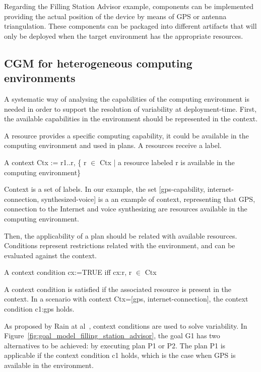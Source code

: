Regarding the Filling Station Advisor example, components can be implemented providing the actual position of the device by means of GPS or antenna triangulation. These components can be packaged into different artifacts that will only be deployed when the target environment has the appropriate resources.

\subsection{CGM for heterogeneous computing environments}
\label{context}

A systematic way of analysing the capabilities of the computing environment is needed in order to support the resolution of variability at deployment-time. First, the available capabilities in the environment should be represented in the context.

\begin{defn}[Resource]

  A resource provides a specific computing capability, it could be available in the computing environment and used in plans. A resources receive a label.

\end{defn}


\begin{defn}[Context]

  A context Ctx := r1..r, \{ r $\in$ Ctx | a resource labeled r is available in the computing environment\}
\end{defn}

Context is a set of labels. In our example, the set [gps-capability,
internet-connection, synthesized-voice] is a an example of context, representing that GPS, connection to the Internet and voice synthesizing are resources available in the computing environment.

Then, the applicability of a plan should be related with available resources. Conditions represent restrictions related with the environment, and can be evaluated against the context.

\begin{defn}
  A context condition cx:=TRUE iff cx:r, r $\in$ Ctx
\end{defn}

A context condition is satisfied if the associated resource is present in the context.
In a scenario with context Ctx=[gps, internet-connection], the context condition c1:gps holds.

As proposed by Rain at al~\cite{ali_goal-based_2010}, context conditions are used to solve variability. In Figure~\ref{fig:goal_model_filling_station_advisor}, the goal G1 has two alternatives to be achieved: by executing plan P1 or P2. The plan P1 is applicable if the context condition c1 holds, which is the case when GPS is available in the environment.


